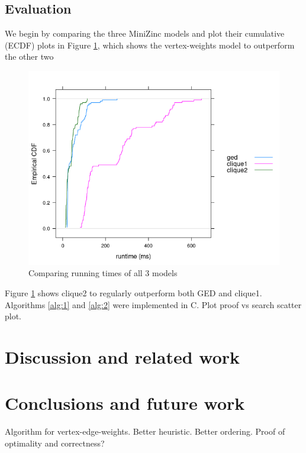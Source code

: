\documentclass{article}
\theoremstyle{definition}
\begin{document}
\subsection{Evaluation}
We begin by comparing the three MiniZinc models and plot their cumulative (ECDF) plots in Figure \ref{fig:comparison}, which shows the vertex-weights model to outperform the other two
\begin{figure}
  \includegraphics[scale=0.75]{comparison.png}
  \caption{Comparing running times of all 3 models}
  \label{fig:comparison}
\end{figure}
Figure \ref{fig:comparison} shows clique2 to regularly outperform both GED and clique1. Algorithms \ref{alg:1} and \ref{alg:2} were implemented in C.
Plot proof vs search scatter plot.
\section{Discussion and related work}
\section{Conclusions and future work}
Algorithm for vertex-edge-weights. Better heuristic. Better ordering. Proof of optimality and correctness?
\end{document}
